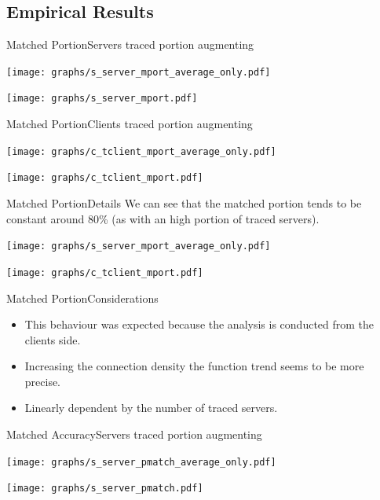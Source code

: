 \subsection{Empirical Results}
	\begin{frame}{Matched Portion}{Servers traced portion augmenting}
			\begin{minipage}{.5\textwidth}
				\texttt{[image: graphs/s\_server\_mport\_average\_only.pdf]}
			\end{minipage}
			\begin{minipage}{.4\textwidth}
				\texttt{[image: graphs/s\_server\_mport.pdf]}
			\end{minipage}
	\end{frame}
	\begin{frame}{Matched Portion}{Clients traced portion augmenting}
			\begin{minipage}{.5\textwidth}
				\texttt{[image: graphs/c\_tclient\_mport\_average\_only.pdf]}
			\end{minipage}
			\begin{minipage}{.4\textwidth}
				\texttt{[image: graphs/c\_tclient\_mport.pdf]}
			\end{minipage}
	\end{frame}
	\begin{frame}{Matched Portion}{Details}
			We can see that the matched portion tends to be constant around 80\% (as with an high portion
			of traced servers).
			\begin{minipage}{.5\textwidth}
				\texttt{[image: graphs/s\_server\_mport\_average\_only.pdf]}
			\end{minipage}
			\begin{minipage}{.4\textwidth}
				\texttt{[image: graphs/c\_tclient\_mport.pdf]}
			\end{minipage}
	\end{frame}
	\begin{frame}{Matched Portion}{Considerations}
		\begin{itemize}
			\item This behaviour was expected because the analysis is conducted from the clients side.
			\item Increasing the connection density the function trend seems to be more precise.
			\item Linearly dependent by the number of traced servers.
		\end{itemize}
	\end{frame}
	\begin{frame}{Matched Accuracy}{Servers traced portion augmenting}
		\begin{minipage}{.5\textwidth}
			\texttt{[image: graphs/s\_server\_pmatch\_average\_only.pdf]}
		\end{minipage}
		\begin{minipage}{.4\textwidth}
			\texttt{[image: graphs/s\_server\_pmatch.pdf]} 
		\end{minipage}
	\end{frame}
